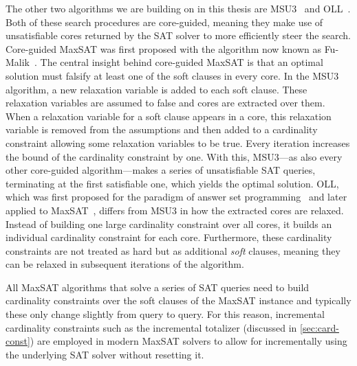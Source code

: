 The other two algorithms we are building on in this thesis are MSU3~\autocite{DBLP:journals/corr/abs-0712-1097} and OLL~\autocite{DBLP:conf/cp/MorgadoDM14,DBLP:journals/jsat/IgnatievMM19}.
Both of these search procedures are core-guided, meaning they make use of unsatisfiable cores returned by the SAT solver to more efficiently steer the search.
Core-guided MaxSAT was first proposed with the algorithm now known as Fu-Malik~\autocite{DBLP:conf/sat/FuM06}.
The central insight behind core-guided MaxSAT is that an optimal solution must falsify at least one of the soft clauses in every core.
In the MSU3 algorithm, a new relaxation variable is added to each soft clause.
These relaxation variables are assumed to false and cores are extracted over them.
When a relaxation variable for a soft clause appears in a core, this relaxation variable is removed from the assumptions and then added to a cardinality constraint allowing some relaxation variables to be true.
Every iteration increases the bound of the cardinality constraint by one.
With this, MSU3---as also every other core-guided algorithm---makes a series of unsatisfiable SAT queries, terminating at the first satisfiable one, which yields the optimal solution.
OLL, which was first proposed for the paradigm of answer set programming~\autocite{DBLP:conf/iclp/AndresKMS12} and later applied to MaxSAT~\autocite{DBLP:conf/cp/MorgadoDM14,DBLP:journals/jsat/IgnatievMM19}, differs from MSU3 in how the extracted cores are relaxed.
Instead of building one large cardinality constraint over all cores, it builds an individual cardinality constraint for each core.
Furthermore, these cardinality constraints are not treated as hard but as additional \emph{soft} clauses, meaning they can be relaxed in subsequent iterations of the algorithm.

All MaxSAT algorithms that solve a series of SAT queries need to build cardinality constraints over the soft clauses of the MaxSAT instance and typically these only change slightly from query to query.
For this reason, incremental cardinality constraints such as the incremental totalizer (discussed in \cref{sec:card-const}) are employed in modern MaxSAT solvers to allow for incrementally using the underlying SAT solver without resetting it.